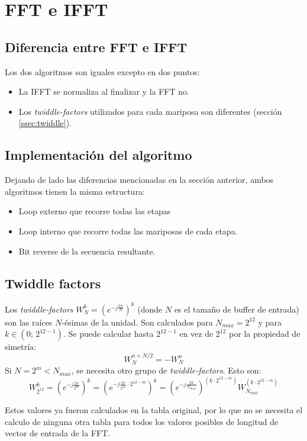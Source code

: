 \documentclass[../ASSD_TP2.tex]{subfiles}
\begin{document}
\section*{FFT e IFFT}

\subsection*{Diferencia entre FFT e IFFT}\label{ssec:dif_fft_ifft}
Los dos algoritmos son iguales excepto en dos puntos:
\begin{itemize}
	\item La IFFT se normaliza al finalizar y la FFT no.
	\item Los \textit{twiddle-factors} utilizados para cada mariposa son diferentes (secci\'on \ref{ssec:twiddle}).
	\end{itemize}

\subsection*{Implementaci\'on del algoritmo}
Dejando de lado las diferencias mencionadas en la secci\'on anterior, ambos algoritmos tienen la misma estructura:
\begin{itemize}
	\item Loop externo que recorre todas las etapas
	\item Loop interno que recorre todas las mariposas de cada etapa.
	\item Bit reverse de la secuencia resultante.
\end{itemize}

\subsection*{Twiddle factors}\label{ssec:twiddle}
Los \textit{twiddle-factors} $W_N^k = \left( e^{-j\frac{2\pi}{N}} \right)^k$ (donde $N$ es el tama\~no de buffer de entrada) son las ra\'ices $N$-\'esimas de la unidad. 
Son calculados para $N_{max}=2^{12}$ y  para $k \in (0;\, 2^{12-1})$. 
Se puede calcular hasta $2^{12-1}$ en vez de $2^{12}$ por la propiedad de simetr\'ia:
\[W_N^{n+N/2} = -W_N^n\]
Si $N = 2^m < N_{max}$, se necesita otro grupo de \textit{twiddle-factors}. Esto son: 
\[ W_{2^{12}}^k = 
\left( e^{-j\frac{2\pi}{2^{m}}} \right)^k = 
\left( e^{-j\frac{2\pi}{2^{12}}\cdot 2^{12-m}} \right)^k  =
\left( e^{-j\frac{2\pi}{N_{max}}} \right)^{\left(k\cdot 2^{12-m}\right)}
W_{N_{max}}^{\left(k\cdot 2^{12-m}\right)} \]

Estos valores ya fueron calculados en la tabla original, por lo que no se necesita el calculo de ninguna otra tabla para todos los valores posibles de longitud de vector de entrada de la FFT.
\end{document}
